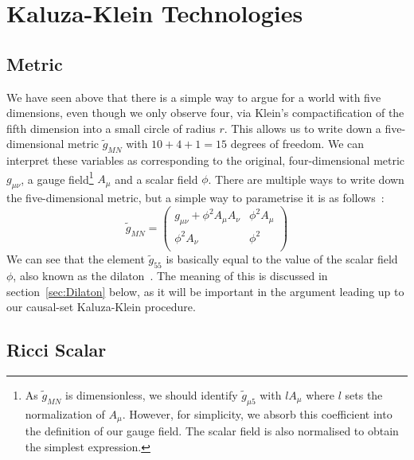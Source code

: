 \documentclass[a4paper,12pt]{article}
\numberwithin{equation}{section}
\begin{document}
\section{Kaluza-Klein Technologies}
\label{sec:Kaluza-Klein Technologies}
\subsection{Metric}
\label{sec:Metric}

We have seen above that there is a simple way to argue for a world with five dimensions, even though we only observe four, via Klein's compactification of the fifth dimension into a small circle of radius $r$. This allows us to write down a five-dimensional metric $\tilde{g}_{MN}$ with $10+4+1=15$ degrees of freedom. We can interpret these variables as corresponding to the original, four-dimensional metric $g_{\mu \nu}$, a gauge field\footnote{As $\tilde{g}_{MN}$ is dimensionless, we should identify $\tilde{g}_{\mu 5}$ with $l A_\mu$ where $l$ sets the normalization of $A_\mu$. However, for simplicity, we absorb this coefficient into the definition of our gauge field. The scalar field is also normalised to obtain the simplest expression.} $A_{\mu}$ and a scalar field $\phi$. There are multiple ways to write down the five-dimensional metric, but a simple way to parametrise it is as follows~\cite{Bailin1987}:
\begin{equation}
\label{eq:Metric}
\tilde{g}_{MN}=\left(\begin{array}{cc}
 g_{\mu \nu}+\phi^2 A_\mu A_\nu & \phi^2 A_\mu \\
\phi^2 A_\nu & \phi^2\\
\end{array}\right)
\end{equation}
We can see that the element $\tilde{g}_{55}$ is basically equal to the value of the scalar field $\phi$, also known as the dilaton~\cite{Zee2013}. The meaning of this is discussed in section~\ref{sec:Dilaton} below, as it will be important in the argument leading up to our causal-set Kaluza-Klein procedure.


\subsection{Ricci Scalar}
\label{sec:Ricci Scalar}
\end{document}

